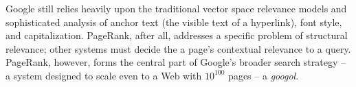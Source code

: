 \documentclass[../exploring-pagerank.tex]{subfiles}
\begin{document}
    Google still relies heavily upon the traditional vector space relevance models and sophisticated analysis of anchor text (the visible text of a hyperlink), font style, and capitalization. PageRank, after all, addresses a specific problem of structural relevance; other systems must decide the a page's contextual relevance to a query. PageRank, however, forms the central part of Google's broader search strategy -- a system designed to scale even to a Web with $10^{100}$ pages -- a \textit{googol}.
\end{document}
